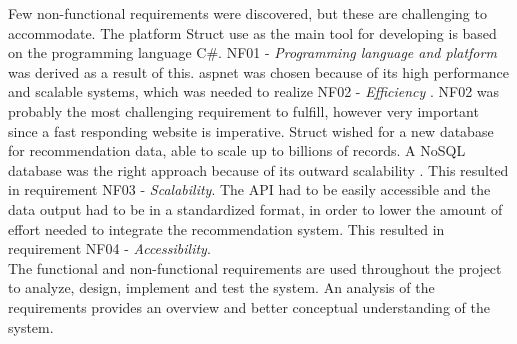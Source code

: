 Few non-functional requirements were discovered, but these are challenging to accommodate. The platform \gls{Struct} use as the main tool for developing is based on the programming language C\#. NF01 - \textit{Programming language and platform} was derived as a result of this. \gls{aspnet} was chosen because of its high performance and scalable systems, which was needed to realize NF02 - \textit{Efficiency} \cite{NetCore}.
NF02 was probably the most challenging requirement to fulfill, however very important since a fast responding website is imperative. \gls{Struct} wished for a new database for recommendation data, able to scale up to billions of records. A \gls{NoSQL} database was the right approach because of its outward scalability \cite{NoSQLScalability}. This resulted in requirement NF03 - \textit{Scalability}. The \gls{API} had to be easily accessible and the data output had to be in a standardized format, in order to lower the amount of effort needed to integrate the recommendation system. This resulted in requirement NF04 - \textit{Accessibility}.\\
The functional and non-functional requirements are used throughout the project to analyze, design, implement and test the system. An analysis of the requirements provides an overview and better conceptual understanding of the system.
